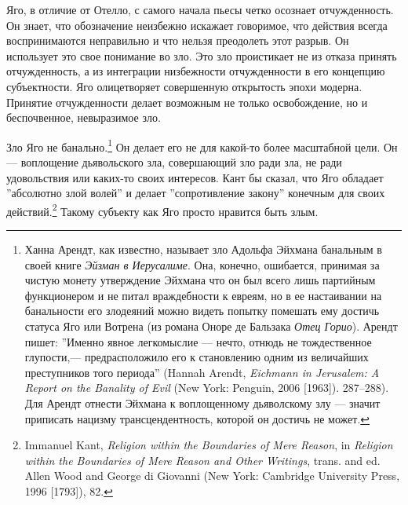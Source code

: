 \documentclass[12pt]{book}
\begin{document}
Яго, в отличие от Отелло, с самого начала пьесы четко осознает отчужденность. Он знает, что обозначение неизбежно искажает говоримое, что действия всегда воспринимаются неправильно и что нельзя преодолеть этот разрыв. Он использует это свое понимание во зло. Это зло проистикает не из отказа принять отчужденность, а из интеграции низбежности отчужденности в его концепцию субъектности. Яго олицетворяет совершенную открытость эпохи модерна. Принятие отчужденности делает возможным не только освобождение, но и беспочвенное, невыразимое зло.

Зло Яго не банально.\footnote{Ханна Арендт, как известно, называет зло Адольфа Эйхмана банальным в своей книге \textit{Эйзман в Иерусалиме}. Она, конечно, ошибается, принимая за чистую монету утверждение Эйхмана что он был всего лишь партийным функционером и не питал враждебности к евреям, но в ее настаивании на банальности его злодеяний можно видеть попытку помешать ему достичь статуса Яго или Вотрена (из романа Оноре де Бальзака \textit{Отец Горио}). Арендт пишет: ''Именно явное легкомыслие --- нечто, отнюдь не тождественное глупости,--- предрасположило его к становлению одним из величайших преступников того периода'' (Hannah Arendt, \textit{Eichmann in Jerusalem: A Report on the Banality of Evil} (New York: Penguin, 2006 [1963]). 287–288). Для Арендт отнести Эйхмана к воплощенному дьяволскому злу --- значит приписать нацизму трансцендентность, которой он достичь не может.} Он делает его не для какой-то более масштабной цели. Он --- воплощение дьявольского зла, совершающий зло ради зла, не ради удовольствия или каких-то своих интересов. Кант бы сказал, что Яго обладает ''абсолютно злой волей'' и делает ''сопротивление закону'' конечным для своих действий.\footnote{Immanuel Kant, \textit{Religion within the Boundaries of Mere Reason}, in \textit{Religion within the Boundaries of Mere Reason and Other Writings}, trans. and ed. Allen Wood and George di Giovanni (New York: Cambridge University Press, 1996 [1793]), 82.} Такому субъекту как Яго просто нравится быть злым.
\end{document}
